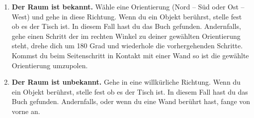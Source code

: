 \documentclass{article}
\begin{document}
\begin{enumerate}[label=(\alph*)]
    \item \textbf{Der Raum ist bekannt.} Wähle eine Orientierung (Nord -- Süd oder Ost -- West) und gehe in diese Richtung. Wenn du ein Objekt berührst, stelle fest ob es der Tisch ist. In diesem Fall hast du das Buch gefunden. Andernfalls, gehe einen Schritt der im rechten Winkel zu deiner gewählten Orientierung steht, drehe dich um 180 Grad und wiederhole die vorhergehenden Schritte. Kommst du beim Seitenschritt in Kontakt mit einer Wand so ist die gewählte Orientierung umzupolen.
    
    \item \textbf{Der Raum ist unbekannt.} Gehe in eine willkürliche Richtung. Wenn du ein Objekt berührst, stelle fest ob es der Tisch ist. In diesem Fall hast du das Buch gefunden. Andernfalls, oder wenn du eine Wand berührt hast, fange von vorne an.
\end{enumerate}
\end{document}
